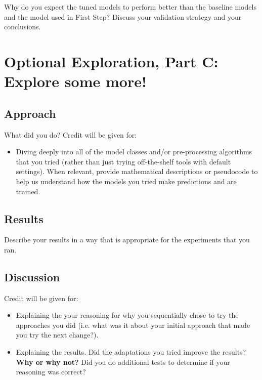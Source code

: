 \documentclass[11pt]{article}
\begin{document}
Why do you expect the tuned models to perform better than the baseline models and the model used in First Step? Discuss your validation strategy and your conclusions.

\section{Optional Exploration, Part C: Explore some more!}
\subsection{Approach}

What did you do? Credit will be given for:
  \begin{itemize}
  \item Diving deeply into all of the model classes and/or pre-processing algorithms that you tried (rather than just trying off-the-shelf tools with default settings).  When relevant, provide mathematical descriptions or pseudocode to help us understand how the models you tried make predictions and are trained. 
  \end{itemize}
  

\subsection{Results}

Describe your results in a way that is appropriate for the experiments that you ran.

\subsection{Discussion}
Credit will be given for:

  \begin{itemize}
  \item Explaining the your reasoning for why you sequentially chose to
    try the approaches you did (i.e. what was it about your initial
    approach that made you try the next change?).  
  \item Explaining the results.  Did the adaptations you tried improve
    the results?  \textbf{Why or why not?}  Did you do additional tests to
    determine if your reasoning was correct?  
  \end{itemize}
 
\end{document}
